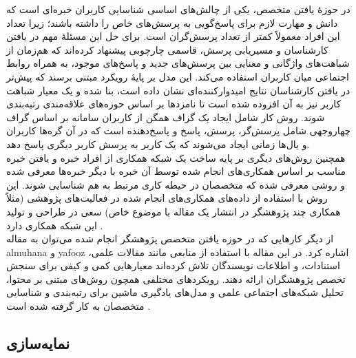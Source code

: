  در حوزهٔ یافتن متخصص، یکی از چالش‌های اساسی شناسایی کاربران خبره‌ای است که دانش و مهارت لازم برای پاسخ‌گویی به پرسش‌های خاص را داشته باشند؛ زیرا تعداد این افراد معمولاً کمتر از تعداد پرسش‌گران است. برای حل این مسئلهٔ مهم در یافتن کارشناسان و مسیریابی پرسش، قاسمی چارچوبی پیشنهاد کرده‌اند که هم‌زمان از شباهت‌های واژگانی و معنایی بین پرسش‌های جدید و پاسخ‌های موجود، به همراه روابط اجتماعی میان کاربران استفاده می‌کند. این مدل بر پایهٔ رویکرد مبتنی برسند که پیش‌تر در یافتن کارشناسان نتایج امیدوارکننده‌ای نشان داده است، بنا شده و یک معیار شباهت کاربر نیز به آن افزوده شده است تا نامزدها بر اساس حوزه‌های علاقه‌مندی رتبه‌بندی شوند. روش کار شامل ایجاد یک گراف همگن از کاربران سامانه بر اساس گراف چهاروجهی شامل پرسش‌گر، پرسش، پاسخ و پاسخ‌دهنده است که در آن گره‌ها کاربران و یال‌ها زمانی ایجاد می‌شوند که یک کاربر به پرسش کاربر دیگری پاسخ دهد\cite{ghasemi_user_2021}.
\\
 همچنین روش‌های دیگری بر پایه ساخت یک شبکه همکاری از افراد خبره و یافتن خبره مناسب بر اساس همکاری‌های انجام شده توسط آن خبره با دیگر خبره‌ها معرفی شده و روشی معرفی شده که متخصصان در حیطه کاری مرتبط به هم شناسایی شوند. این روش با استفاده از داده‌های همکاری‌های انجام شده در فعالیت‌های پژوهشی (مثلاً همکاری چند پژوهشگر در انتشار یک مقاله با موضوع خاص) سعی در طراحی و تولید این شبکه همکاری دارد \cite{hashemi_expertise_2013}.
\\
 از دیگر کارهایی که در حوزه یافتن متخصص پژوهشگر انجام شده می‌توان به مقاله almuhana و yafooz اشاره کرد. در این مقاله با استفاده از منابعی مانند مقالات علمی، استنادات، و اطلاعات نویسندگان تلاش کرده‌اند معیارهایی کمی و کیفی برای سنجش تخصص پژوهشگران ارائه دهند. رویکردهای مختلفی همچون روش‌های مبتنی بر محتوا، تحلیل شبکه‌های اجتماعی علمی و مدل‌های یادگیری ماشین برای رتبه‌بندی و شناسایی متخصصان به کار گرفته شده است \cite{almuhanna_expert_2021}.

\subsection{نمایه‌سازی}

